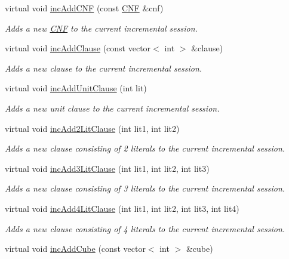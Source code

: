 \begin{DoxyCompactItemize}
virtual void \hyperlink{classPicoSatApi_a619b3cb3b059b06c34f84d9ae123c042}{inc\-Add\-C\-N\-F} (const \hyperlink{classCNF}{C\-N\-F} \&cnf)
\begin{DoxyCompactList}\small\item\em Adds a new \hyperlink{classCNF}{C\-N\-F} to the current incremental session. \end{DoxyCompactList}\item 
virtual void \hyperlink{classPicoSatApi_aaafa1c5c7f1058029127a39a32ceada6}{inc\-Add\-Clause} (const vector$<$ int $>$ \&clause)
\begin{DoxyCompactList}\small\item\em Adds a new clause to the current incremental session. \end{DoxyCompactList}\item 
virtual void \hyperlink{classPicoSatApi_a0ef01830dacfd23f63928b44ff3df788}{inc\-Add\-Unit\-Clause} (int lit)
\begin{DoxyCompactList}\small\item\em Adds a new unit clause to the current incremental session. \end{DoxyCompactList}\item 
virtual void \hyperlink{classPicoSatApi_a5c31301a2b0dfc70251f285e737a6fc2}{inc\-Add2\-Lit\-Clause} (int lit1, int lit2)
\begin{DoxyCompactList}\small\item\em Adds a new clause consisting of 2 literals to the current incremental session. \end{DoxyCompactList}\item 
virtual void \hyperlink{classPicoSatApi_a1daeb6e2b3bfa3eee44a7bf1b278dd86}{inc\-Add3\-Lit\-Clause} (int lit1, int lit2, int lit3)
\begin{DoxyCompactList}\small\item\em Adds a new clause consisting of 3 literals to the current incremental session. \end{DoxyCompactList}\item 
virtual void \hyperlink{classPicoSatApi_a45f1182c46055eb6e88f5abf6e6af043}{inc\-Add4\-Lit\-Clause} (int lit1, int lit2, int lit3, int lit4)
\begin{DoxyCompactList}\small\item\em Adds a new clause consisting of 4 literals to the current incremental session. \end{DoxyCompactList}\item 
virtual void \hyperlink{classPicoSatApi_ae0a7dd7da9ead164560f454e29457453}{inc\-Add\-Cube} (const vector$<$ int $>$ \&cube)

\end{DoxyCompactItemize}
